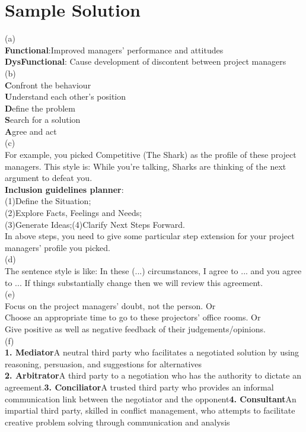 \documentclass{article}
\begin{document}
\section*{Sample Solution}
(a) \\
\textbf{Functional}:Improved managers' performance and attitudes\\
\textbf{DysFunctional}: Cause development of discontent between project managers\\
(b)\\
\textbf{C}onfront the behaviour\\
\textbf{U}nderstand each other's position \\
\textbf{D}efine the problem\\
\textbf{S}earch for a solution\\
\textbf{A}gree and act\\
(c)\\
For example, you picked Competitive {(The Shark)} as the profile of these project managers. This style is: While you're talking, Sharks are thinking of the next argument to defeat you.\\
\textbf{Inclusion guidelines planner}:\\
(1)Define the Situation;\\
(2)Explore Facts, Feelings and Needs;\\
(3)Generate Ideas;(4)Clarify Next Steps Forward.\\
In above steps, you need to give some particular step extension for your project managers' profile you picked. \\
\newline
(d)\\
The sentence style is like: In these (...) circumstances, I agree to ... and you agree to ... If things substantially change then we will review this agreement.\\
\newline
(e)\\
Focus on the project managers' doubt, not the person. Or\\
Choose an appropriate time to go to these projectors' office rooms. Or\\
Give positive as well as negative feedback of their judgements/opinions.\\
\newline
(f)\\
\textbf{1. Mediator}A neutral third party who facilitates a negotiated solution by using reasoning, persuasion, and suggestions for alternatives\\\textbf{2. Arbitrator}A third party to a negotiation who has the authority to dictate an agreement.\textbf{3. Conciliator}A trusted third party who provides an informal communication link between the negotiator and the opponent\textbf{4. Consultant}An impartial third party, skilled in conflict management, who attempts to facilitate creative problem solving through communication and analysis\\
\end{document}
